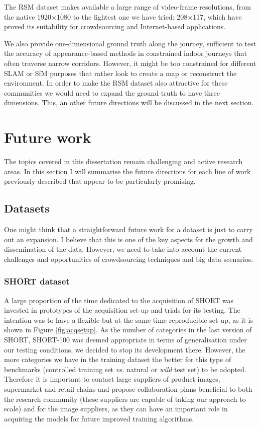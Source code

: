 The RSM dataset makes available a large range of video-frame resolutions, from the native 1920$\times$1080 to the lightest one we have tried: 208$\times$117, which have proved its suitability for crowdsourcing and Internet-based applications.

We also provide one-dimensional ground truth along the journey, sufficient to test the accuracy of appearance-based methods in constrained indoor journeys that often traverse narrow corridors. However, it might be too constrained for different SLAM or SfM purposes that rather look to create a map or reconstruct the environment. In order to make the RSM dataset also attractive for these communities we would need to expand the ground truth to have three dimensions. This, an other future directions will be discussed in the next section.

\section{Future work}
\label{sec:futurework}

The topics covered in this dissertation remain challenging and active research areas. In this section I will summarise the future directions for each line of work previously described that appear to be particularly promising.

\subsection{Datasets}

One might think that a straightforward future work for a dataset is just to carry out an expansion. I believe that this is one of the key aspects for the growth and dissemination of the data. However, we need to take into account the current challenges and opportunities of crowdsourcing techniques and big data scenarios.

\subsubsection{SHORT dataset}

A large proportion of the time dedicated to the acquisition of SHORT was invested in prototypes of the acquisition set-up and trials for its testing. The intention was to have a flexible but at the same time reproducible set-up, as it is shown in Figure  \ref{fig:acqsetup}. As the number of categories in the last version of SHORT, SHORT-100 was deemed appropriate in terms of generalisation under our testing conditions, we decided to stop its development there. However, the more categories we have in the training dataset the better for this type of benchmarks (controlled training set \textit{vs.} natural or \textit{wild} test set) to be adopted. Therefore it is important to contact large suppliers of product images, supermarket and retail chains and propose collaboration plans beneficial to both the research community (these suppliers are capable of taking our approach to scale) and for the image suppliers, as they can have an important role in acquiring the models for future improved training algorithms.

